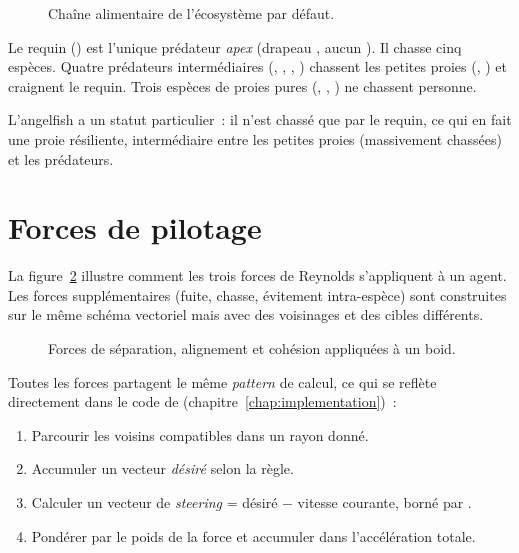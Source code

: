 \begin{figure}[h!]
\centering

\caption{Chaîne alimentaire de l'écosystème par défaut.}
\label{fig:predator-prey}
\end{figure}

Le requin () est l'unique prédateur \emph{apex}
(drapeau , aucun ). Il
chasse cinq espèces. Quatre prédateurs intermédiaires
(, , , )
chassent les petites proies (, )
et craignent le requin. Trois espèces de proies pures
(, , ) ne
chassent personne.

L'angelfish a un statut particulier~: il n'est chassé que par
le requin, ce qui en fait une proie résiliente, intermédiaire
entre les petites proies (massivement chassées) et les
prédateurs.

\section{Forces de pilotage}

La figure~\ref{fig:boids-forces} illustre comment les trois
forces de Reynolds s'appliquent à un agent. Les forces
supplémentaires (fuite, chasse, évitement intra-espèce) sont
construites sur le même schéma vectoriel mais avec des
voisinages et des cibles différents.

\begin{figure}[h!]
\centering

\caption{Forces de séparation, alignement et cohésion appliquées à un boid.}
\label{fig:boids-forces}
\end{figure}

Toutes les forces partagent le même \emph{pattern} de calcul,
ce qui se reflète directement dans le code de
 (chapitre~\ref{chap:implementation})~:

\begin{enumerate}
  \item Parcourir les voisins compatibles dans un rayon donné.
  \item Accumuler un vecteur \emph{désiré} selon la règle.
  \item Calculer un vecteur de \emph{steering} = désiré $-$
    vitesse courante, borné par .
  \item Pondérer par le poids de la force et accumuler dans
    l'accélération totale.
\end{enumerate}

